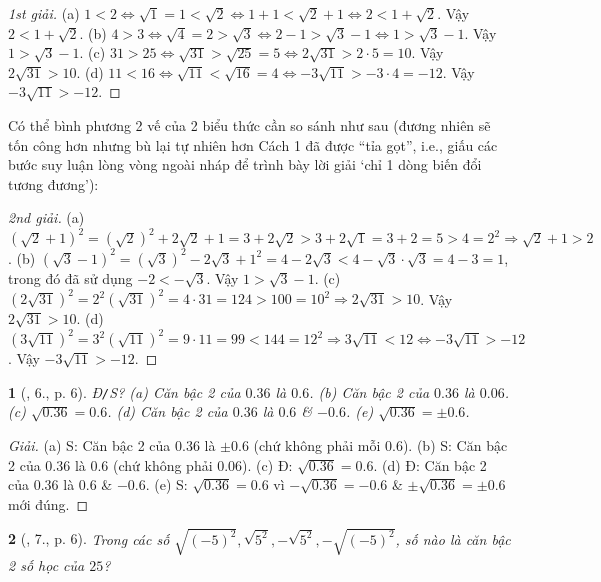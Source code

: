 \documentclass{article}
\newtheorem{baitoan}{}
\begin{document}
\begin{proof}[1st giải]
	(a) $1 < 2\Leftrightarrow\sqrt{1} = 1 < \sqrt{2}\Leftrightarrow1 + 1 < \sqrt{2} + 1\Leftrightarrow 2 < 1 + \sqrt{2}$. Vậy $2 < 1 + \sqrt{2}$. (b) $4 > 3\Leftrightarrow\sqrt{4} = 2 > \sqrt{3}\Leftrightarrow2 - 1 > \sqrt{3} - 1\Leftrightarrow1 > \sqrt{3} - 1$. Vậy $1 > \sqrt{3} - 1$. (c) $31 > 25\Leftrightarrow\sqrt{31} > \sqrt{25} = 5\Leftrightarrow2\sqrt{31} > 2\cdot5 = 10$. Vậy $2\sqrt{31} > 10$. (d) $11 < 16\Leftrightarrow\sqrt{11} < \sqrt{16} = 4\Leftrightarrow-3\sqrt{11} > -3\cdot4 = -12$. Vậy $-3\sqrt{11} > -12$.
\end{proof}
Có thể bình phương 2 vế của 2 biểu thức cần so sánh như sau (đương nhiên sẽ tốn công hơn nhưng bù lại tự nhiên hơn Cách 1 đã được ``tỉa gọt'', i.e., giấu các bước suy luận lòng vòng ngoài nháp để trình bày lời giải `chỉ 1 dòng biến đổi tương đương'):
\begin{proof}[2nd giải]
	(a) $(\sqrt{2} + 1)^2 = (\sqrt{2})^2 + 2\sqrt{2} + 1 = 3 + 2\sqrt{2} > 3 + 2\sqrt{1} = 3 + 2 = 5 > 4 = 2^2\Rightarrow\sqrt{2} + 1 > 2$. (b) $(\sqrt{3} - 1)^2 = (\sqrt{3})^2 - 2\sqrt{3} + 1^2 = 4 - 2\sqrt{3} < 4 - \sqrt{3}\cdot\sqrt{3} = 4 - 3 = 1$, trong đó đã sử dụng $-2 < -\sqrt{3}$. Vậy $1 > \sqrt{3} - 1$. (c) $(2\sqrt{31})^2 = 2^2(\sqrt{31})^2 = 4\cdot31 = 124 > 100 = 10^2\Rightarrow2\sqrt{31} > 10$. Vậy $2\sqrt{31} > 10$. (d) $(3\sqrt{11})^2 = 3^2(\sqrt{11})^2 = 9\cdot11 = 99 < 144 = 12^2\Rightarrow3\sqrt{11} < 12\Leftrightarrow-3\sqrt{11} > -12$. Vậy $-3\sqrt{11} > -12$.
\end{proof}

\begin{baitoan}[\cite{SBT_Toan_9_tap_1}, 6., p. 6]
	\emph{Đ\texttt{/}S?} (a) Căn bậc 2 của $0.36$ là $0.6$. (b) Căn bậc 2 của $0.36$ là $0.06$. (c) $\sqrt{0.36} = 0.6$. (d) Căn bậc 2 của $0.36$ là $0.6$ \& $-0.6$. (e) $\sqrt{0.36} = \pm0.6$.
\end{baitoan}

\begin{proof}[Giải]
	(a) S: Căn bậc 2 của 0.36 là $\pm0.6$ (chứ không phải mỗi 0.6). (b) S: Căn bậc 2 của 0.36 là 0.6 (chứ không phải 0.06). (c) Đ: $\sqrt{0.36} = 0.6$. (d) Đ: Căn bậc 2 của $0.36$ là $0.6$ \& $-0.6$. (e) S: $\sqrt{0.36} = 0.6$ vì $-\sqrt{0.36} = -0.6$ \& $\pm\sqrt{0.36} = \pm0.6$ mới đúng.
\end{proof}

\begin{baitoan}[\cite{SBT_Toan_9_tap_1}, 7., p. 6]
	Trong các số $\sqrt{(-5)^2},\sqrt{5^2},-\sqrt{5^2},-\sqrt{(-5)^2}$, số nào là căn bậc 2 số học của $25$?
\end{baitoan}
\end{document}
